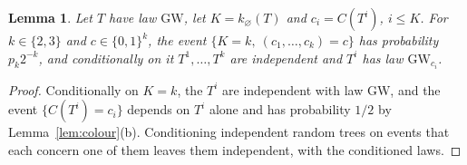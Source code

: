 \documentclass[11pt]{amsart}
\newtheorem{lemma}{Lemma}
\theoremstyle{remark}
\numberwithin{equation}{section}
\newcommand{\GW}{\mathrm{GW}}
\begin{document}
\begin{lemma}\label{lem:cond}
Let $T$ have law $\GW$, let $K=k_\varnothing(T)$ and $c_i=C(T^i)$, $i\le K$. For $k\in\{2,3\}$ and $c\in\{0,1\}^k$, the event $\{K=k,\ (c_1,\dots,c_k)=c\}$ has probability $p_k2^{-k}$, and conditionally on it $T^1,\dots,T^k$ are independent and $T^i$ has law $\GW_{c_i}$.
\end{lemma}

\begin{proof}
Conditionally on $K=k$, the $T^i$ are independent with law $\GW$, and the event $\{C(T^i)=c_i\}$ depends on $T^i$ alone and has probability $1/2$ by Lemma~\ref{lem:colour}(b). Conditioning independent random trees on events that each concern one of them leaves them independent, with the conditioned laws.
\end{proof}
\end{document}
